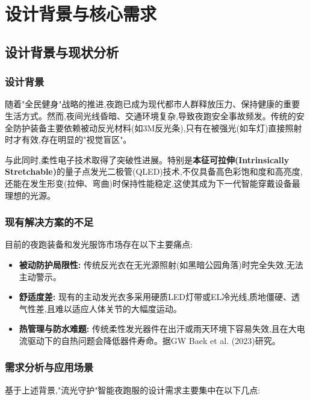 \documentclass[12pt,a4paper]{article}
\begin{document}

\maketoc

\section{设计背景与核心需求}

\subsection{设计背景与现状分析}

\subsubsection{设计背景}
随着"全民健身"战略的推进,夜跑已成为现代都市人群释放压力、保持健康的重要生活方式。然而,夜间光线昏暗、交通环境复杂,导致夜跑安全事故频发。传统的安全防护装备主要依赖被动反光材料(如3M反光条),只有在被强光(如车灯)直接照射时才有效,存在明显的"视觉盲区"。

与此同时,柔性电子技术取得了突破性进展。特别是\textbf{本征可拉伸(Intrinsically Stretchable)}的量子点发光二极管(QLED)技术,不仅具备高色彩饱和度和高亮度,还能在发生形变(拉伸、弯曲)时保持性能稳定,这使其成为下一代智能穿戴设备最理想的光源\cite{kim2024intrinsically}。

\subsubsection{现有解决方案的不足}
目前的夜跑装备和发光服饰市场存在以下主要痛点:

\begin{itemize}
    \item \textbf{被动防护局限性:} 传统反光衣在无光源照射(如黑暗公园角落)时完全失效,无法主动警示。
    
    \item \textbf{舒适度差:} 现有的主动发光衣多采用硬质LED灯带或EL冷光线,质地僵硬、透气性差,且难以适应人体关节的大幅度运动。
    
    \item \textbf{热管理与防水难题:} 传统柔性发光器件在出汗或雨天环境下容易失效,且在大电流驱动下的自热问题会降低器件寿命。据GW Baek et al. (2023)研究\cite{choi2023highly}。
\end{itemize}

\subsubsection{需求分析与应用场景}
基于上述背景,"流光守护"智能夜跑服的设计需求主要集中在以下几点:
\end{document}
